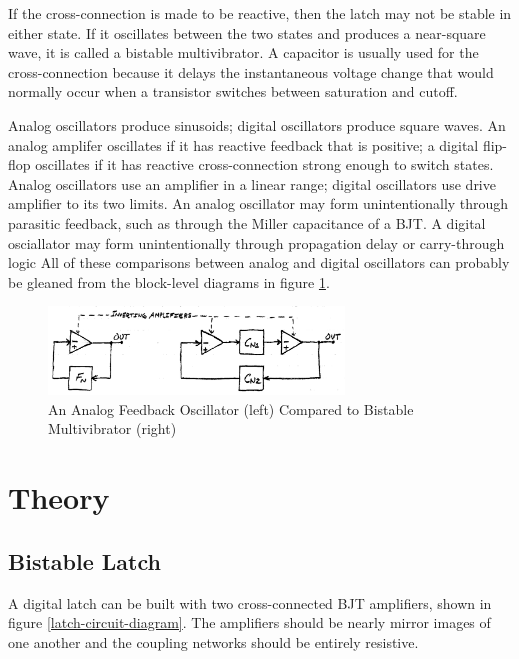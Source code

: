 \documentclass[titlepage, letterpaper, 10.5pt]{article}
\begin{document}
If the cross-connection is made to be reactive, then the latch may not be stable in either state.
If it oscillates between the two states and produces a near-square wave, it is called a bistable multivibrator.
A capacitor is usually used for the cross-connection because it delays the instantaneous voltage change
that would normally occur when a transistor switches between saturation and cutoff.

Analog oscillators produce sinusoids; digital oscillators produce square waves.
An analog amplifer oscillates if it has reactive feedback that is positive;
a digital flip-flop oscillates if it has reactive cross-connection strong enough to switch states.
Analog oscillators use an amplifier in a linear range; digital oscillators use drive
amplifier to its two limits.
An analog oscillator may form unintentionally through parasitic feedback,
such as through the Miller capacitance of a BJT.
A digital osciallator may form unintentionally through propagation delay or carry-through
logic
All of these comparisons between analog and digital oscillators can probably be gleaned
from the block-level diagrams in figure \ref{oscillator-block-diagrams}.

\begin{figure}[ht]
	\centering
	\includegraphics[width=0.7\textwidth]{diagrams/block-level-oscillators}
	\caption{An Analog Feedback Oscillator (left) Compared to Bistable Multivibrator (right)}
	\label{oscillator-block-diagrams}
\end{figure}

\clearpage
\section{Theory}

\subsection{Bistable Latch}
\label{bistable-latch}

A digital latch can be built with two cross-connected BJT amplifiers, shown in figure
\ref{latch-circuit-diagram}. The amplifiers should be nearly mirror images of one another and the
coupling networks should be entirely resistive.
\end{document}
